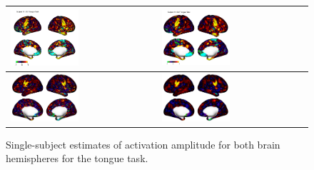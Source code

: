 \documentclass{article}
\begin{document}
\begin{figure}
\begin{tabularx}{\textwidth}{|X|X|}
			\includegraphics[width=0.48\textwidth]{plots/600_subject_111312_tongue_classical_estimates.png} &
			\includegraphics[width=0.48\textwidth]{plots/600_subject_111312_tongue_estimates.png} \\ \hline
			\includegraphics[width=0.48\textwidth]{plots/600_subject_114823_tongue_classical_estimates.png} &
			\includegraphics[width=0.48\textwidth]{plots/600_subject_114823_tongue_estimates.png} \\ \hline
		\end{tabularx}
		\caption{Single-subject estimates of activation amplitude for both brain hemispheres for the tongue task.}
		\label{fig:tongue_est_single_subject}
	\end{figure}
\end{document}
